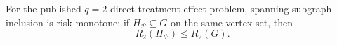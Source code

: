 For the published \(q=2\) direct-treatment-effect problem, spanning-subgraph inclusion is risk monotone: if \(H_{\mathcal P}\subseteq G\) on the same vertex set, then
\[
R_2(H_{\mathcal P})\leq R_2(G).
\]
